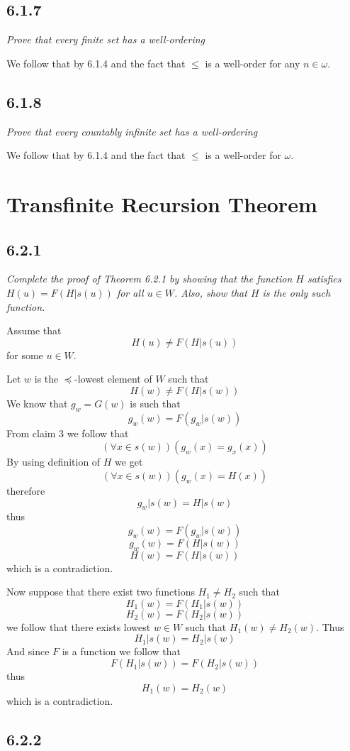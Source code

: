 \documentclass[11pt,oneside,titlepage]{book}
\begin{document}
\subsection*{6.1.7}

\textit{Prove that every finite set has a well-ordering}

We follow that by 6.1.4 and the fact that $\leq$ is a well-order
for any $n \in \omega$.

\subsection*{6.1.8}

\textit{Prove that every countably infinite set has a well-ordering}

We follow that by 6.1.4 and the fact that $\leq$ is a well-order
for $\omega$.

\section{Transfinite Recursion Theorem}

\subsection*{6.2.1}

\textit{Complete the proof of Theorem 6.2.1 by showing that the function $H$ satisfies
  $H(u) = F(H|s(u))$ for all $u \in W$. Also, show that $H$ is the only such function.}

Assume that 
$$H(u) \neq F(H|s(u))$$
for some $u \in W$.

Let $w$ is the $\preceq$-lowest element of $W$ such that
$$H(w) \neq F(H|s(w))$$
We know that $g_w = G(w)$ is such that
$$g_w(w) = F(g_w|s(w))$$
From claim 3 we follow that
$$(\forall x \in s(w))(g_w(x) = g_x(x))$$
By using definition of $H$  we get
$$(\forall x \in s(w))(g_w(x) = H(x))$$
therefore
$$g_w|s(w) = H|s(w)$$
thus
$$g_w(w) = F(g_w|s(w))$$
$$g_w(w) = F(H|s(w))$$
$$H(w) = F(H|s(w))$$
which is a contradiction.

Now suppose that there exist two functions $H_1 \neq H_2$  such that
$$H_1(w) = F(H_1|s(w))$$
$$H_2(w) = F(H_2|s(w))$$
we follow that there exists lowest $w \in W$ such that $H_1(w) \neq H_2(w)$. Thus
$$H_1|s(w) = H_2|s(w)$$
And since $F$ is a function we follow that 
$$F(H_1|s(w)) = F(H_2|s(w))$$
thus
$$H_1(w) = H_2(w)$$
which is a contradiction.

\subsection*{6.2.2}
\end{document}
